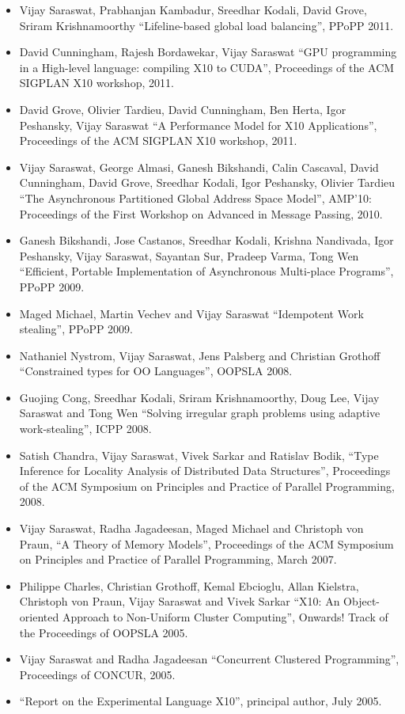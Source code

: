 \documentclass{article}
\begin{document}
\begin{itemize}
\item Vijay Saraswat, Prabhanjan Kambadur, Sreedhar Kodali, David
  Grove, Sriram Krishnamoorthy ``Lifeline-based global load
  balancing'', PPoPP 2011. 
\item David Cunningham, Rajesh Bordawekar, Vijay Saraswat ``GPU
  programming in a High-level language: compiling X10 to CUDA'',
  Proceedings of the ACM SIGPLAN X10 workshop, 2011.
\item David Grove, Olivier Tardieu, David Cunningham, Ben Herta, Igor
  Peshansky, Vijay Saraswat ``A Performance Model for X10
  Applications'',   Proceedings of the ACM SIGPLAN X10 workshop, 2011.

\item Vijay Saraswat, George Almasi, Ganesh Bikshandi, Calin Cascaval,
  David Cunningham, David Grove, Sreedhar Kodali, Igor Peshansky,
  Olivier Tardieu ``The Asynchronous Partitioned Global Address Space
  Model'', AMP'10: Proceedings of the First Workshop on Advanced in
  Message Passing, 2010.
\item Ganesh Bikshandi, Jose Castanos, Sreedhar Kodali, Krishna Nandivada, Igor Peshansky, Vijay Saraswat, Sayantan Sur, Pradeep Varma, Tong Wen ``Efficient, Portable Implementation of Asynchronous Multi-place Programs'', PPoPP 2009.

\item Maged Michael, Martin Vechev and Vijay Saraswat ``Idempotent Work stealing'', PPoPP 2009.

\item Nathaniel Nystrom, Vijay Saraswat, Jens Palsberg and Christian
Grothoff ``Constrained types for OO Languages'', OOPSLA
2008.

\item Guojing Cong, Sreedhar Kodali, Sriram Krishnamoorthy, Doug Lee,
Vijay Saraswat and Tong Wen ``Solving irregular graph problems using
adaptive work-stealing'', ICPP 2008.

\item Satish Chandra, Vijay Saraswat, Vivek Sarkar and Ratislav Bodik,
``Type Inference for Locality Analysis of Distributed Data
Structures'', Proceedings of the ACM Symposium on Principles and
Practice of Parallel Programming, 2008.

\item Vijay Saraswat, Radha Jagadeesan, Maged Michael and Christoph
von Praun, ``A Theory of Memory Models'', Proceedings of the ACM
Symposium on Principles and Practice of Parallel Programming, March
2007.

\item Philippe Charles, Christian Grothoff, Kemal Ebcioglu, Allan
  Kielstra, Christoph von Praun, Vijay Saraswat and Vivek Sarkar
  ``X10: An Object-oriented Approach to Non-Uniform Cluster
  Computing'', Onwards! Track of the Proceedings of OOPSLA 2005.

\item Vijay Saraswat and Radha Jagadeesan ``Concurrent Clustered
  Programming'', Proceedings of CONCUR, 2005.

\item ``Report on the Experimental Language X10'', principal author,
July 2005.
\end{itemize}				   
\end{document}
